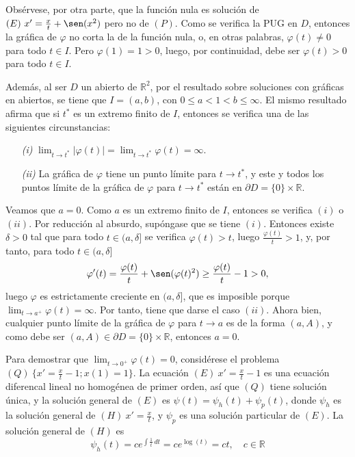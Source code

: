 \documentclass[11pt]{report}
\newcommand{\R}{\mathbb R}
\begin{document}
\vspace{2mm}

Obsérvese, por otra parte, que la función nula es solución de $(E) \ x'=\frac{x}{t}+\sen(x^2)$ pero no de $(P)$. Como se verifica la PUG en $D$, entonces la gráfica de $\varphi$ no corta la de la función nula, o, en otras palabras, $\varphi(t) \neq 0$ para todo $t \in I$. Pero $\varphi(1)=1>0$, luego, por continuidad, debe ser $\varphi(t)>0$ para todo $t \in I$.

\vspace{2mm}

Además, al ser $D$ un abierto de $\R^2$, por el resultado sobre soluciones con gráficas en abiertos, se tiene que $I=(a,b)$, con $0 \leq a < 1 < b \leq \infty$. El mismo resultado afirma que si $t^*$ es un extremo finito de $I$, entonces se verifica una de las siguientes circunstancias:
\begin{itemize}
    \item[\textit{(i)}] $\lim_{t \to t^*} |\varphi(t)|=\lim_{t \to t^*} \varphi(t)=\infty$.
    \item[\textit{(ii)}] La gráfica de $\varphi$ tiene un punto límite para $t \to t^*$, y este y todos los puntos límite de la gráfica de $\varphi$ para $t \to t^*$ están en $\partial D = \{0\} \times \R$.
\end{itemize}

Veamos que $a=0$. Como $a$ es un extremo finito de $I$, entonces se verifica $(i)$ o $(ii)$. Por reducción al absurdo, supóngase que se tiene $(i)$. Entonces existe $\delta >0$ tal que para todo $t \in (a,\delta]$ se verifica $\varphi(t)>t$, luego $\frac{\varphi(t)}{t}>1$, y, por tanto, para todo $t \in (a,\delta]$
\[\varphi'(t)=\frac{\varphi(t)}{t}+\sen(\varphi(t)^2) \geq \frac{\varphi(t)}{t}-1 > 0,\]
luego $\varphi$ es estrictamente creciente en $(a,\delta]$, que es imposible porque $\lim_{t \to a^+}\varphi(t)=\infty$. Por tanto, tiene que darse el caso $(ii)$. Ahora bien, cualquier punto límite de la gráfica de $\varphi$ para $t \to a$ es de la forma $(a,A)$, y como debe ser $(a,A) \in \partial D=\{0\} \times \R$, entonces $a=0$. 

\vspace{2mm}

Para demostrar que $\lim_{t \to 0^+}\varphi(t)=0$, considérese el problema $(Q) \ \{x'=\frac{x}{t}-1;x(1)=1\}$. La ecuación $(E) \ x'=\frac{x}{t}-1$ es una ecuación diferencal lineal no homogénea de primer orden, así que $(Q)$ tiene solución única, y la solución general de $(E)$ es $\psi(t)=\psi_h(t)+\psi_p(t)$, donde $\psi_h$ es la solución general de $(H) \ x'=\frac{x}{t}$, y $\psi_p$ es una solución particular de $(E)$. La solución general de $(H)$ es
\[\psi_h(t)=ce^{\int \frac{1}{t} \, dt} = ce^{\log(t)} = ct, \quad c \in \R\]
\end{document}

